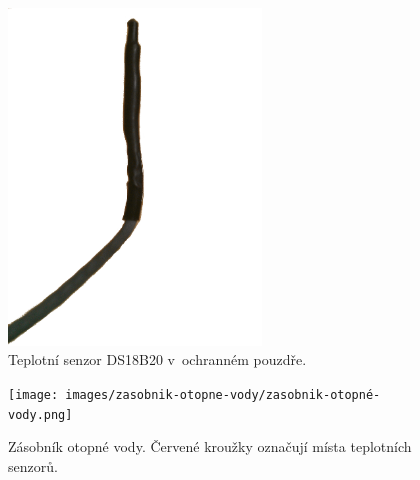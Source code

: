 \begin{figure}[H]
    \centering
    \includegraphics[width=0.6\textwidth]{images/zasobnik-otopne-vody/ds18b20-ochrana.png}
    \caption{Teplotní senzor DS18B20 v~ochranném pouzdře.}
    \label{fig:ds18b20-ochrana}
\end{figure}

\begin{figure}[H]
    \centering
    \texttt{[image: images/zasobnik-otopne-vody/zasobnik-otopné-vody.png]}
    \caption[Zásobník otopné vody.]{Zásobník otopné vody. Červené kroužky označují místa teplotních senzorů.}
    \label{fig:zasobnik-otopné-vody}
\end{figure}
